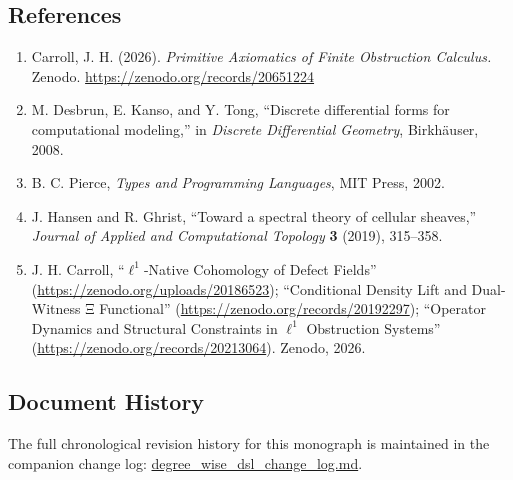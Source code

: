 \documentclass[
]{article}
\begin{document}
\subsection{References}\label{references}

\begin{enumerate}
\def\labelenumi{\arabic{enumi}.}
\item
  Carroll, J. H. (2026). \emph{Primitive Axiomatics of Finite Obstruction Calculus.} Zenodo. \url{https://zenodo.org/records/20651224}
\item
  M. Desbrun, E. Kanso, and Y. Tong, ``Discrete differential forms for computational modeling,'' in \emph{Discrete Differential Geometry}, Birkhäuser, 2008.
\item
  B. C. Pierce, \emph{Types and Programming Languages}, MIT Press, 2002.
\item
  J. Hansen and R. Ghrist, ``Toward a spectral theory of cellular sheaves,'' \emph{Journal of Applied and Computational Topology} \textbf{3} (2019), 315--358.
\item
  J. H. Carroll, ``\(\ell^1\)-Native Cohomology of Defect Fields'' (\url{https://zenodo.org/uploads/20186523}); ``Conditional Density Lift and Dual-Witness Ξ Functional'' (\url{https://zenodo.org/records/20192297}); ``Operator Dynamics and Structural Constraints in \(\ell^1\) Obstruction Systems'' (\url{https://zenodo.org/records/20213064}). Zenodo, 2026.
\end{enumerate}

\subsection{Document History}\label{document-history}

The full chronological revision history for this monograph is maintained in the companion change log: \url{degree_wise_dsl_change_log.md}.
\end{document}
